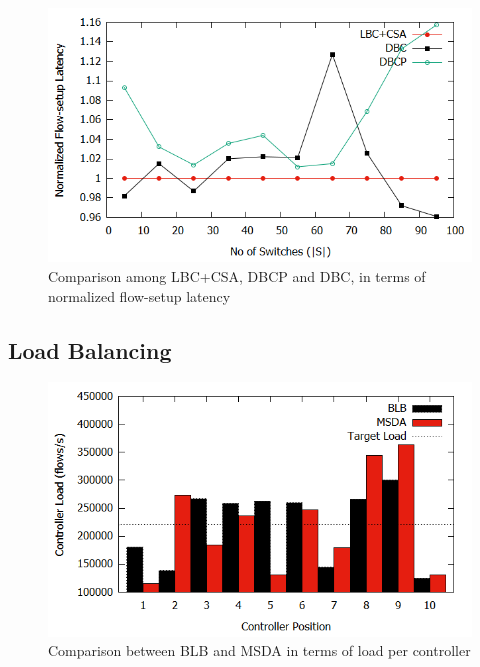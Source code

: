 \documentclass[journal]{IEEEtran}
\begin{document}
\begin{figure}
	\centering
	\includegraphics[width=\linewidth]{Images/forced_comparison.png}
	\caption{Comparison among LBC+CSA, DBCP and DBC, in terms of normalized flow-setup latency} \label{fig:Fcomparison}
\end{figure}

\subsection{Load Balancing} \label{LoadAnalysis}


\begin{figure}
	\centering
	\includegraphics[width=\linewidth]{Images/load_comparison.png}
	\caption{Comparison between BLB and MSDA in terms of load per controller} \label{fig:Lcomparison}
\end{figure}
\end{document}
